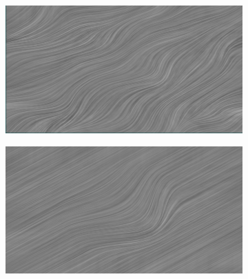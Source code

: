 \begin{figure}
	\centering	
	\begin{subfigure}{0.45\textwidth}
		\includegraphics[height=\textwidth,width=\textwidth]{figures/mylic.png}
		\caption{}
		\label{fig:mylic1}
	\end{subfigure}
	\hfill
	\begin{subfigure}{0.45\textwidth}
		\includegraphics[height=\textwidth,width=\textwidth]{figures/mylic2.png}

\end{subfigure}
\end{figure}
